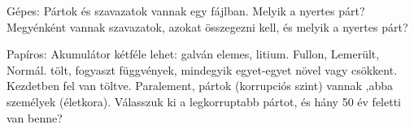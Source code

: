 \documentclass[12pt,a4paper]{article}
\begin{document}
Gépes: Pártok és szavazatok vannak egy fájlban. Melyik a nyertes párt?
Megyénként vannak szavazatok, azokat összegezni kell, és melyik a nyertes párt?

Papíros: Akumulátor kétféle lehet: galván elemes, litium. Fullon, Lemerült, Normál. tölt, fogyaszt függvények, mindegyik egyet-egyet növel vagy csökkent. Kezdetben fel van töltve.
Paralement, pártok (korrupciós szint) vannak ,abba személyek (életkora). Válasszuk ki a legkorruptabb pártot, és hány 50 év feletti van benne? 
\end{document}
